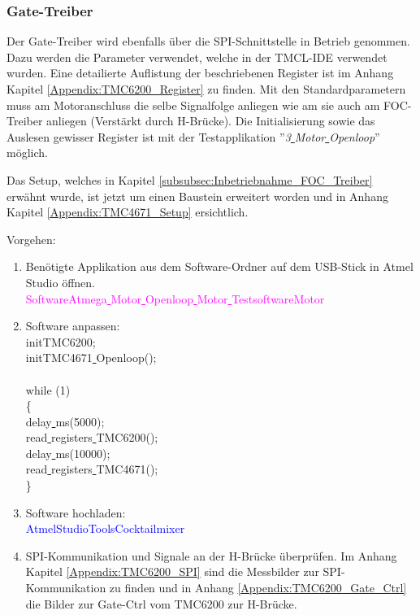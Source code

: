 \subsubsection{Gate-Treiber}
\label{subsubsec:Inbetriebnahme_Gate_Treiber}

Der Gate-Treiber wird ebenfalls über die SPI-Schnittstelle in Betrieb genommen. Dazu werden die Parameter verwendet, welche in der TMCL-IDE verwendet wurden. Eine detailierte Auflistung der beschriebenen Register ist im Anhang Kapitel \ref{Appendix:TMC6200_Register} zu finden. Mit den Standardparametern muss am Motoranschluss die selbe Signalfolge anliegen wie am sie auch am FOC-Treiber anliegen (Verstärkt durch H-Brücke). Die Initialisierung sowie das Auslesen gewisser Register ist mit der Testapplikation ''\textit{3\underline{ }Motor\underline{ }Openloop}'' möglich.

Das Setup, welches in Kapitel \ref{subsubsec:Inbetriebnahme_FOC_Treiber} erwähnt wurde, ist jetzt um einen Baustein erweitert worden und in Anhang Kapitel \ref{Appendix:TMC4671_Setup} ersichtlich.

Vorgehen:
\begin{enumerate}
\item Benötigte Applikation aus dem Software-Ordner auf dem USB-Stick in Atmel Studio öffnen.\\
\textcolor{magenta}{Software\textrightarrow Atmega\underline{ }Motor\underline{ }Openloop\underline{ }Motor\underline{ }Testsoftware\textrightarrow Motor}\\


\item Software anpassen:\\
\textcolor{OliveGreen}{
	initTMC6200;\\
	initTMC4671\underline{ }Openloop();\\
\\
    while (1) \\
    \{\\
		\underline{ }delay\underline{ }ms(5000);\\
		read\underline{ }registers\underline{ }TMC6200();\\
		\underline{ }delay\underline{ }ms(10000);\\
		read\underline{ }registers\underline{ }TMC4671();\\
    \}
}\newline
\item Software hochladen:\\
\textcolor{blue}{AtmelStudio\textrightarrow Tools\textrightarrow Cocktailmixer}\\

\item SPI-Kommunikation und Signale an der H-Brücke überprüfen. Im Anhang Kapitel \ref{Appendix:TMC6200_SPI} sind die Messbilder zur SPI-Kommunikation zu finden und in Anhang \ref{Appendix:TMC6200_Gate_Ctrl} die Bilder zur Gate-Ctrl vom TMC6200 zur H-Brücke.

\end{enumerate}